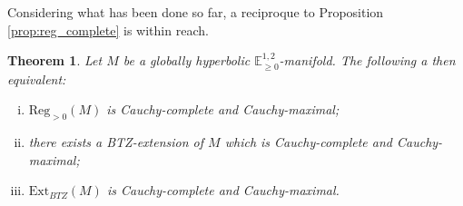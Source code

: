 \documentclass[a4paper,12pt]{article}
\newcommand{\mass}[1]{{\mathbb E}^{1,2}_{#1}}
\def\Reg{\mathrm{Reg}}
\def\BTZext{\mathrm{Ext}_{BTZ}}
\def\reg{\Reg}
\newtheorem{theo}{Theorem}    %
\begin{document}
                  

                 Considering what has been done so far, a reciproque to Proposition \ref{prop:reg_complete} is within reach. 
                 
				\begin{theo}\label{btzthm:BTZ_Cauchy-completness} \label{theo:BTZ_Cauchy-completness}
				Let $M$ be a globally hyperbolic $\mass{\geq0}$-manifold. The following a then equivalent:			
				\begin{enumerate}[(i)]
				\item $\reg_{>0}(M)$ is Cauchy-complete and Cauchy-maximal;
				\item there exists a BTZ-extension of $M$ which is Cau\-chy-com\-plete and Cau\-chy-maxi\-mal;
				\item $\BTZext(M)$ is Cauchy-complete and Cauchy-maxi\-mal.
				\end{enumerate}
				\end{theo}
				
\end{document}
